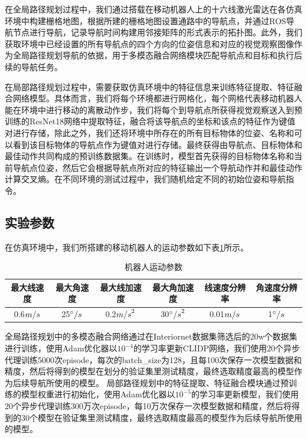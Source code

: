 在全局路径规划过程中，我们通过搭载在移动机器人上的十六线激光雷达在各仿真环境中构建栅格地图，根据所建的栅格地图设置通路中的导航点，并通过ROS导航节点进行导航，记录导航时间构建用邻接矩阵的形式表示的拓扑图。此外，我们获取环境中已经设置的所有导航点的四个方向的位姿信息和对应的视觉观察图像作为全局路径规划导航的依据，用于多模态融合网络模块匹配导航点和目标和执行后续的导航任务。

在局部路径规划过程中，需要获取仿真环境中的特征信息来训练特征提取、特征融合网络模型。具体而言，我们将每个环境都进行网格化，每个网格代表移动机器人能在环境中进行移动的离散动作步，我们将每个到导航点所获得视觉观察送入到预训练的ResNet18网络中提取特征，融合将该导航点的坐标和该点的特征作为键值对进行存储，除此之外，我们还将环境中所存在的所有目标物体的位姿、名称和可以看到该目标物体的导航点作为键值对进行存储。最终获得由导航点、目标物体和最佳动作共同构成的预训练数据集。在训练时，模型首先获得的目标物体名称和当前导航点位姿，然后它会根据导航点所对应的特征输出一个导航动作并和最佳动作计算交叉熵。在不同环境的测试过程中，我们随机给定不同的初始位姿和导航指令。



\subsection{实验参数}%
在仿真环境中，我们所搭建的移动机器人的运动参数如下表\ref{robotparameter}所示。
\begin{table}
    \caption{\label{robotparameter}机器人运动参数}
    \centering
    \small
    \begin{tabular}{cccccc}
        \hline
        最大线速度 & 最大角速度 & 最大线加速度 & 最大角加速度 & 线速度分辨率 & 角速度分辨率 \tabularnewline 
        \hline 
        0.6${m \mathord{\left/
 {\vphantom {m s}} \right.
 \kern-\nulldelimiterspace} s}$ & 25${^\circ  \mathord{\left/
 {\vphantom {^\circ  s}} \right.
 \kern-\nulldelimiterspace} s}$ &  0.2${{m \mathord{\left/
 {\vphantom {m s}} \right.
 \kern-\nulldelimiterspace} s}^2}$ & 30${{^\circ  \mathord{\left/
 {\vphantom {^\circ  s}} \right.
 \kern-\nulldelimiterspace} s}^2}$  &  0.01${m \mathord{\left/
 {\vphantom {m s}} \right.
 \kern-\nulldelimiterspace} s}$ &  1${^\circ  \mathord{\left/
 {\vphantom {^\circ  s}} \right.
 \kern-\nulldelimiterspace} s}$ \tabularnewline
        \hline 
    \end{tabular}
\end{table}

全局路径规划中的多模态融合网络通过在Interiornet数据集筛选后的20w个数据集进行训练，使用Adam优化器以${10^{ - 4}}$的学习率更新CLIDP网络，我们使用20个异步代理训练5000次episode，每次的batch\_size为128，且每100次保存一次模型数据和精度，然后将得到的模型在划分的验证集里测试精度，最终选取精度最高的模型作为后续导航所使用的模型。
局部路径规划中的特征提取、特征融合模块通过预训练的模型权重进行初始化，使用Adam优化器以${10^{ - 5}}$的学习率更新模型，我们使用20个异步代理训练300万次episode，每10万次保存一次模型数据和精度，然后将得到的30个模型在验证集里测试精度，最终选取精度最高的模型作为后续导航所使用的模型。




